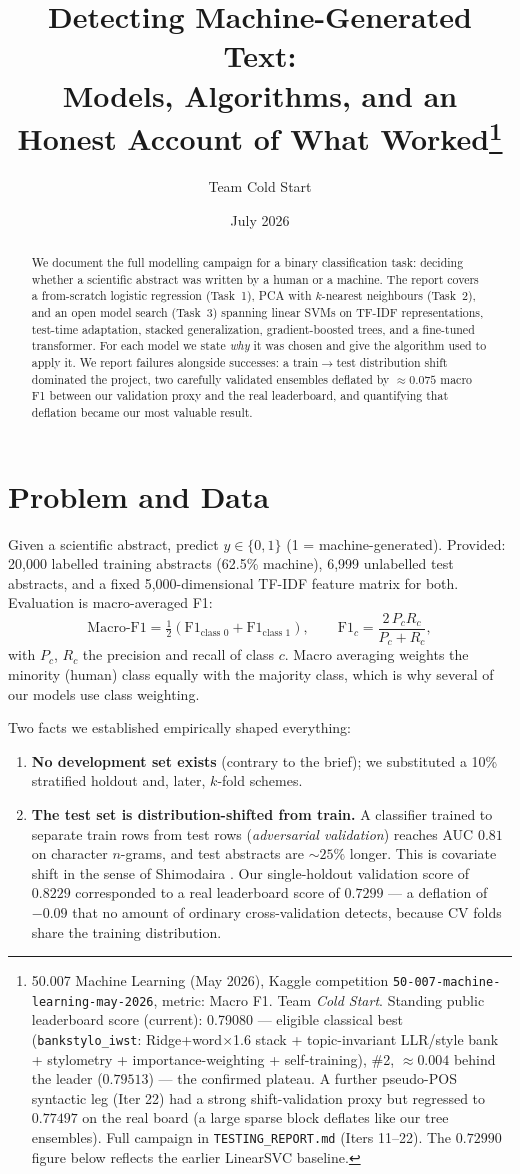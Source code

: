 \documentclass[11pt,a4paper]{article}
\title{Detecting Machine-Generated Text:\\ Models, Algorithms, and an Honest Account of What Worked\thanks{50.007 Machine Learning (May 2026), Kaggle competition \texttt{50-007-machine-learning-may-2026}, metric: Macro F1. Team \emph{Cold Start}. Standing public leaderboard score (current): 0.79080 --- eligible classical best (\texttt{bankstylo\_iwst}: Ridge+word$\times$1.6 stack + topic-invariant LLR/style bank + stylometry + importance-weighting + self-training), \#2, ${\approx}0.004$ behind the leader ($0.79513$) --- the confirmed plateau. A further pseudo-POS syntactic leg (Iter 22) had a strong shift-validation proxy but regressed to $0.77497$ on the real board (a large sparse block deflates like our tree ensembles). Full campaign in \texttt{TESTING\_REPORT.md} (Iters 11--22). The $0.72990$ figure below reflects the earlier LinearSVC baseline.}}
\author{Team Cold Start}
\date{July 2026}
\newcommand{\F}{\mathrm{F1}}
\begin{document}
\maketitle

\begin{abstract}
We document the full modelling campaign for a binary classification task: deciding whether a scientific abstract was written by a human or a machine. The report covers a from-scratch logistic regression (Task~1), PCA with $k$-nearest neighbours (Task~2), and an open model search (Task~3) spanning linear SVMs on TF-IDF representations, test-time adaptation, stacked generalization, gradient-boosted trees, and a fine-tuned transformer. For each model we state \emph{why} it was chosen and give the algorithm used to apply it. We report failures alongside successes: a train$\to$test distribution shift dominated the project, two carefully validated ensembles deflated by $\approx 0.075$ macro F1 between our validation proxy and the real leaderboard, and quantifying that deflation became our most valuable result.
\end{abstract}

\section{Problem and Data}\label{sec:data}

Given a scientific abstract, predict $y \in \{0,1\}$ (1 = machine-generated). Provided: 20{,}000 labelled training abstracts (62.5\% machine), 6{,}999 unlabelled test abstracts, and a fixed 5{,}000-dimensional TF-IDF feature matrix for both. Evaluation is macro-averaged F1:
\begin{equation}
\text{Macro-}\F = \tfrac{1}{2}\left(\F_{\text{class }0} + \F_{\text{class }1}\right), \qquad
\F_c = \frac{2\,P_c R_c}{P_c + R_c},
\end{equation}
with $P_c$, $R_c$ the precision and recall of class $c$. Macro averaging weights the minority (human) class equally with the majority class, which is why several of our models use class weighting.

Two facts we established empirically shaped everything:
\begin{enumerate}
\item \textbf{No development set exists} (contrary to the brief); we substituted a 10\% stratified holdout and, later, $k$-fold schemes.
\item \textbf{The test set is distribution-shifted from train.} A classifier trained to separate train rows from test rows (\emph{adversarial validation}) reaches AUC $0.81$ on character $n$-grams, and test abstracts are ${\sim}25\%$ longer. This is covariate shift in the sense of Shimodaira \cite{shimodaira2000}. Our single-holdout validation score of $0.8229$ corresponded to a real leaderboard score of $0.7299$ --- a deflation of $-0.09$ that no amount of ordinary cross-validation detects, because CV folds share the training distribution.
\end{enumerate}
\end{document}
